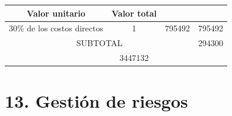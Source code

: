 \documentclass[
11pt, %
codirector, %
]{charter}
\begin{document}
\begin{table}[htpb]
\begin{tabularx}{\linewidth}{@{}|X|c|r|r|@{}}
		\multicolumn{1}{c|}{\cellcolor[HTML]{C0C0C0}Valor unitario} &
		\multicolumn{1}{c|}{\cellcolor[HTML]{C0C0C0}Valor total}        \\ \hline
		\multicolumn{1}{|l|}{30\% de los costos directos}           &
		\multicolumn{1}{c|}{1}                                      &
		\multicolumn{1}{c|}{795492}                                 &
		\multicolumn{1}{c|}{795492}                                     \\ \hline
		\multicolumn{3}{|c|}{SUBTOTAL}                              &
		\multicolumn{1}{c|}{294300}                                     \\ \hline
		\rowcolor[HTML]{C0C0C0}
		\multicolumn{3}{|c|}{TOTAL}                                 &
		\multicolumn{1}{c|}{3447132}                                    \\ \hline
	\end{tabularx}%
\end{table}


\section{13. Gestión de riesgos}
\label{sec:riesgos}
\end{document}
